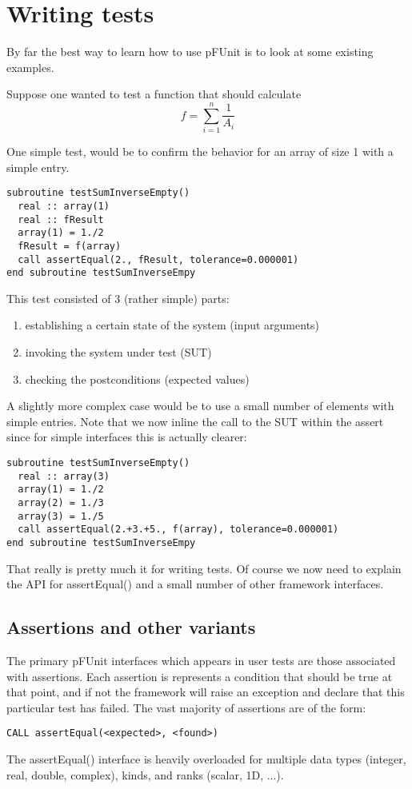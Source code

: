 \documentclass[10pt]{article}
\newcommand{\pfunit}{{\sc pFUnit }}
\begin{document}
\section{Writing tests}

By far the best way to learn how to use \pfunit is to look at some
existing examples.

Suppose one wanted to test a function that should calculate
\[
f = \sum_{i=1}^{n} \frac{1}{A_i}
\]

One simple test, would be to confirm the behavior for an array of size
1 with a simple entry.
\begin{verbatim}
subroutine testSumInverseEmpty()
  real :: array(1)
  real :: fResult
  array(1) = 1./2
  fResult = f(array)
  call assertEqual(2., fResult, tolerance=0.000001)
end subroutine testSumInverseEmpy
\end{verbatim}

This test consisted of 3 (rather simple) parts:
\begin{enumerate}
\item establishing a certain state of the system (input arguments)
\item invoking the system under test (SUT)
\item checking the postconditions (expected values)
\end{enumerate}

A slightly more complex case would be to use a small number of
elements with simple entries.  Note that we now inline the call to the
SUT within the assert since for simple interfaces this is actually
clearer:

\begin{verbatim}
subroutine testSumInverseEmpty()
  real :: array(3)
  array(1) = 1./2
  array(2) = 1./3
  array(3) = 1./5
  call assertEqual(2.+3.+5., f(array), tolerance=0.000001)
end subroutine testSumInverseEmpy
\end{verbatim}


That really is pretty much it for writing tests.  Of course we now
need to explain the API for assertEqual() and a small number of other
framework interfaces.


\subsection{Assertions and other variants}

The primary \pfunit interfaces which appears in user tests are those
associated with assertions.  Each assertion is represents a condition
that should be true at that point, and if not the framework will raise
an exception and declare that this particular test has failed.  The
vast majority of assertions are of the form:
\begin{verbatim}
CALL assertEqual(<expected>, <found>)
\end{verbatim}
The assertEqual() interface is heavily overloaded for multiple data
types (integer, real, double, complex), kinds, and ranks (scalar, 1D,
...).
\end{document}
